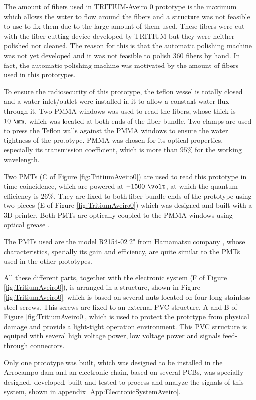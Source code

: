 The amount of fibers used in TRITIUM-Aveiro 0 prototype is the maximum which allows the water to flow around the fibers and a structure was not feasible to use to fix them due to the large amount of them used. These fibers were cut with the fiber cutting device developed by TRITIUM but they were neither polished nor cleaned. The reason for this is that the automatic polishing machine was not yet developed and it was not feasible to polish 360 fibers by hand. In fact, the automatic polishing machine was motivated by the amount of fibers used in this prototypes.

To ensure the radiosecurity of this prototype, the teflon vessel is totally closed and  a water inlet/outlet were installed in it to allow a constant water flux through it. Two PMMA windows was used to read the fibers, whose thick is $10~\mm$, which was located at both ends of the fiber bundle. Two clamps are used to press the Teflon walls against the PMMA windows to ensure the water tightness of the prototype. PMMA was chosen for its optical properties, especially its transmission coefficient, which is more than $95\%$ for the working wavelength.

Two PMTs (C of Figure \ref{fig:TritiumAveiro0}) are used to read this prototype in time coincidence, which are powered at $-1500~\volt$, at which the quantum efficiency is $26\%$. They are fixed to both fiber bundle ends of the prototype using two pieces (E of Figure \ref{fig:TritiumAveiro0}) which was designed and built with a 3D printer. Both PMTs are optically coupled to the PMMA windows using optical grease \cite{OpticalGrease}.

The PMTs used are the model R2154-02 2" from Hamamatsu company \cite{DataSheetPMTsAveiro}, whose characteristics, specially its gain and efficiency, are quite similar to the PMTs used in the other prototypes.

All these different parts, together with the electronic system (F of Figure \ref{fig:TritiumAveiro0}), is arranged in a structure, shown in Figure \ref{fig:TritiumAveiro0}, which is based on several nuts located on four long stainless-steel screws. This screws are fixed to an external PVC structure, A and B of Figure \ref{fig:TritiumAveiro0}, which is used to protect the prototype from physical damage and provide a light-tight operation environment. This PVC structure is equiped with several high voltage power, low voltage power and signals feed-through connectors.

Only one prototype was built, which was designed to be installed in the Arrocampo dam and an electronic chain, based on several PCBs, was specially designed, developed, built and tested to process and analyze the signals of this system, shown in appendix \ref{App:ElectronicSystemAveiro}.

